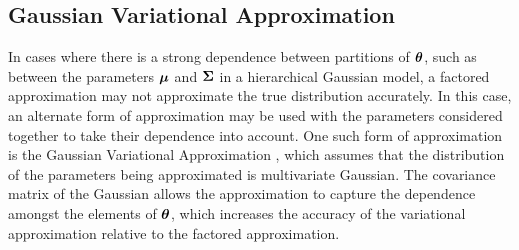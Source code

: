 



\subsection{Gaussian Variational Approximation}

In cases where there is a strong dependence between partitions of ${\boldsymbol \theta}$,  such as between the parameters
${\boldsymbol \mu}$ and ${\boldsymbol \Sigma}$ in a hierarchical Gaussian model, a factored approximation may not approximate the true
distribution accurately. In this case, an alternate form of approximation may be used with the parameters
considered together to take their dependence into account. One such form of approximation is the Gaussian
Variational Approximation \cite{Ormerod2012}, which assumes that the distribution of the parameters being
approximated is multivariate Gaussian. The covariance matrix of the Gaussian allows the approximation to
capture the dependence amongst the elements of ${\boldsymbol \theta}$, which increases the accuracy of the variational
approximation relative to the factored approximation.

